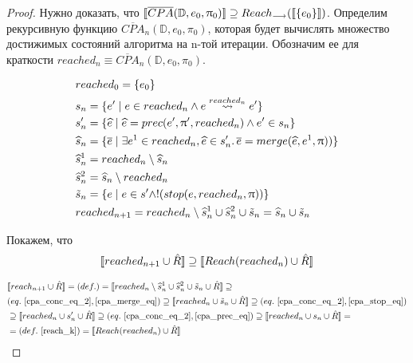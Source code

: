 \begin{proof}
Нужно доказать, что $[\![ \overline{CPA}(\mathbb{D}, e_0, \uppi_0) ]\!] \supseteq Reach_{\longrightarrow}([\![ \{e_0\} ]\!])$.
Определим рекурсивную функцию $\overline{CPA}_n(\mathbb{D}, e_0, \pi_0)$, которая будет вычислять множество достижимых состояний алгоритма на n-той итерации.
 Обозначим ее для краткости $reached_n \equiv \overline{CPA}_n(\mathbb{D}, e_0, \pi_0)$.

 \begin{equation}
 \label{cpa_recursive_algorithm}
 \begin{aligned}
 & reached_0 = \{e_0\} \\
 & s_n = \{e' \mid e \in reached_n \land e \stackrel{reached_n}{\leadsto} e'\} \\
 & s'_n = \{\widehat{e} \mid \widehat{e} = prec(e',\uppi',reached_n) \land e' \in s_n\} \\
 & \widehat{s}_n = \{\overline{e} \mid \exists e^1 \in reached_n, \widehat{e} \in s'_n \ldotp \overline{e} = merge(\widehat{e}, e^1, \uppi))\} \\
 & \widehat{s}^1_n = reached_n \setminus \widehat{s}_n \\
 & \widehat{s}^2_n = \widehat{s}_n \setminus reached_n \\
 & \tilde{s}_n = \{e \mid e \in s' \land !(stop(e, reached_n, \uppi))\} \\
 & reached_{n+1} = reached_n \setminus \widehat{s}^1_n \cup \widehat{s}^2_n \cup \tilde{s}_n = \widehat{s}_n \cup \tilde{s}_n\\
 \end{aligned}
 \end{equation}

Покажем, что 
 \begin{equation}
 \label{algorithm_lemma_1}
 \begin{aligned}
 \conc{reached_{n+1} \cup \hat{R}} \supseteq \conc{Reach(reached_n) \cup \hat{R}} \end{aligned}
 \end{equation}

 \begin{align*}
 & \conc{reach_{n+1} \cup \hat{R}} = (def.) = \conc{reached_n \setminus \widehat{s}^1_n \cup \widehat{s}^2_n \cup \tilde{s}_n \cup \hat{R}} \supseteq \\
 & (eq.~\ref{cpa_conc_eq_2},\ref{cpa_merge_eq}) \supseteq \conc{reached_n  \cup \tilde{s}_n \cup \hat{R}}  
  \supseteq (eq.~\ref{cpa_conc_eq_2},\ref{cpa_stop_eq})\\
  & \supseteq \conc{reached_n  \cup s'_n \cup \hat{R}}  \supseteq (eq.~\ref{cpa_conc_eq_2},\ref{cpa_prec_eq}) \supseteq \conc{reached_n  \cup s_n \cup \hat{R}} =\\
  &= (def.~\ref{reach_k}) = \conc{Reach(reached_n) \cup \hat{R}}
 \end{align*}
 

\end{proof}

